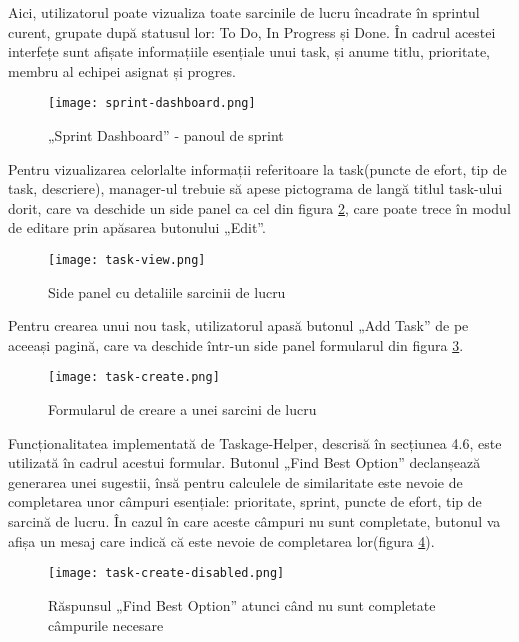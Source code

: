 Aici, utilizatorul poate vizualiza toate sarcinile de lucru încadrate în sprintul curent, grupate după statusul lor: To Do, In Progress și Done. În cadrul acestei interfețe sunt afișate informațiile esențiale unui task, și anume titlu, prioritate, membru al echipei asignat și progres.

 \begin{figure}[H]
	\centering
 	 \texttt{[image: sprint-dashboard.png]}
	\caption{„Sprint Dashboard” - panoul de sprint}
	\label{fig:sprint-dashboard}
 \end{figure}

Pentru vizualizarea celorlalte informații referitoare la task(puncte de efort, tip de task, descriere), manager-ul trebuie să apese pictograma de langă titlul task-ului dorit, care va deschide un side panel ca cel din figura \ref{fig:task-view}, care poate trece în modul de editare prin apăsarea butonului „Edit”.

 \begin{figure}[H]
	\centering
 	 \texttt{[image: task-view.png]}
	\caption{Side panel cu detaliile sarcinii de lucru}
	\label{fig:task-view}
 \end{figure}

Pentru crearea unui nou task, utilizatorul apasă butonul „Add Task” de pe aceeași pagină, care va deschide într-un side panel formularul din figura \ref{fig:task-create}.

 \begin{figure}[H]
	\centering
 	 \texttt{[image: task-create.png]}
	\caption{Formularul de creare a unei sarcini de lucru}
	\label{fig:task-create}
 \end{figure}

Funcționalitatea implementată de Taskage-Helper, descrisă în secțiunea 4.6, este utilizată în cadrul acestui formular. Butonul „Find Best Option” declanșează generarea unei sugestii, însă pentru calculele de similaritate este nevoie de completarea unor câmpuri esențiale: prioritate, sprint, puncte de efort, tip de sarcină de lucru. În cazul în care aceste câmpuri nu sunt completate, butonul va afișa un mesaj care indică că este nevoie de completarea lor(figura \ref{fig:task-create-disabled}).

 \begin{figure}[H]
	\centering
 	 \texttt{[image: task-create-disabled.png]}
	\caption{Răspunsul „Find Best Option” atunci când nu sunt completate câmpurile necesare}
	\label{fig:task-create-disabled}
 \end{figure}

